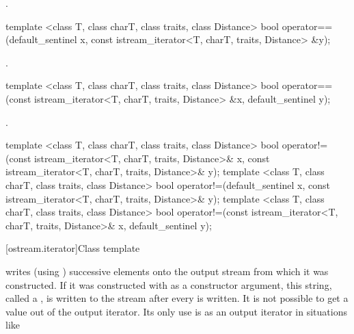 \begin{itemdescr}
\pnum
\returns
{}.%
\end{itemdescr}

\begin{itemdecl}
template <class T, class charT, class traits, class Distance>
  bool operator==(default_sentinel x,
                  const istream_iterator<T, charT, traits, Distance> &y);
\end{itemdecl}

\begin{itemdescr}
\pnum
\returns
{}.%
\end{itemdescr}

\begin{itemdecl}
template <class T, class charT, class traits, class Distance>
  bool operator==(const istream_iterator<T, charT, traits, Distance> &x,
                  default_sentinel y);
\end{itemdecl}

\begin{itemdescr}
\pnum
\returns
{}.%
\end{itemdescr}

%
%
\begin{itemdecl}
template <class T, class charT, class traits, class Distance>
  bool operator!=(const istream_iterator<T, charT, traits, Distance>& x,
                  const istream_iterator<T, charT, traits, Distance>& y);
template <class T, class charT, class traits, class Distance>
  bool operator!=(default_sentinel x,
                  const istream_iterator<T, charT, traits, Distance>& y);
template <class T, class charT, class traits, class Distance>
  bool operator!=(const istream_iterator<T, charT, traits, Distance>& x,
                  default_sentinel y);
\end{itemdecl}

%
\begin{itemdescr}
\pnum
\returns
{}
\end{itemdescr}

[ostream.iterator]{Class template }

\pnum
{}%
writes (using
)
successive elements onto the output stream from which it was constructed.
If it was constructed with
as a constructor argument, this string, called a
,
is written to the stream after every
is written.
It is not possible to get a value out of the output iterator.
Its only use is as an output iterator in situations like

